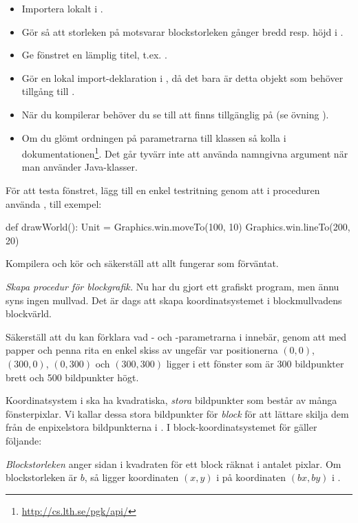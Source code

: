 \begin{itemize}%
  \item Importera  lokalt i .
  \item Gör så att storleken på  motsvarar blockstorleken gånger bredd resp. höjd i .
  \item Ge fönstret en lämplig titel, t.ex. .
  \item Gör en lokal import-deklaration i , då det bara är detta objekt som behöver tillgång till .
  \item När du kompilerar behöver du se till att  finns tillgänglig på  (se övning \texttt{\ExeWeekFOUR}).
  \item Om du glömt ordningen på parametrarna till klassen  så kolla i dokumentationen\footnote{\url{http://cs.lth.se/pgk/api/}}. Det går tyvärr inte att använda namngivna argument när man använder Java-klasser.
\end{itemize}

För att testa fönstret, lägg till en enkel testritning genom att i proceduren  använda , till exempel:
\begin{Code}
  def drawWorld(): Unit = {
    Graphics.win.moveTo(100, 10)
    Graphics.win.lineTo(200, 20)
  }
\end{Code}
Kompilera och kör och säkerställ att allt fungerar som förväntat.


\Task \emph{Skapa procedur för blockgrafik.} Nu har du gjort ett grafiskt program, men ännu syns ingen mullvad.
Det är dags att skapa koordinatsystemet i blockmullvadens blockvärld.

\Subtask\Pen
Säkerställ att du kan förklara vad - och -parametrarna i  innebär, genom att med papper och penna rita en enkel skiss av ungefär var positionerna $(0,0)$, $(300, 0)$, $(0, 300)$ och $(300, 300)$ ligger i ett fönster som är 300 bildpunkter brett och 500 bildpunkter högt.

\Subtask
Koordinatsystem i  ska ha kvadratiska, \emph{stora} bildpunkter som består av många fönsterpixlar. Vi kallar dessa stora bildpunkter för \emph{block} för att lättare skilja dem från de enpixelstora bildpunkterna i . I block-koordinatsystemet för  gäller följande:

\begin{framed}
\noindent \emph{Blockstorleken} anger sidan i kvadraten för ett block räknat i antalet pixlar. Om blockstorleken är $b$, så ligger koordinaten $(x, y)$ i  på koordinaten $(bx, by)$ i .

\end{framed}

